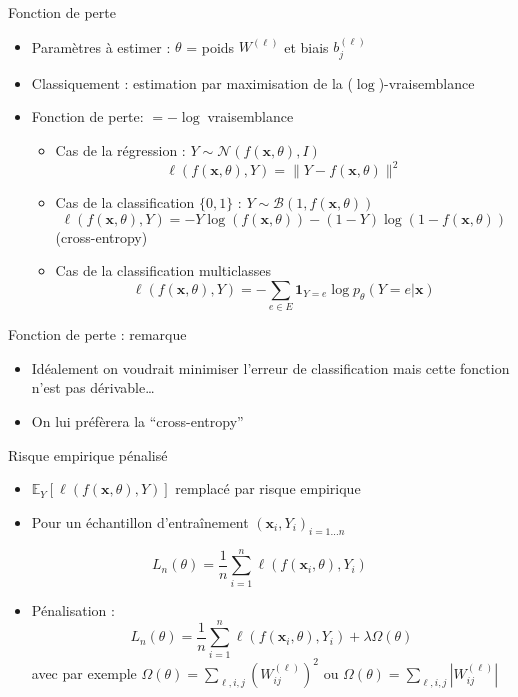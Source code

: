\documentclass[ignorenonframetext,]{beamer}
\providecommand{\tightlist}{%
  \setlength{\itemsep}{0pt}\setlength{\parskip}{0pt}}
\begin{document}
\begin{frame}{Fonction de perte}

\begin{itemize}
\tightlist
\item
  Paramètres à estimer : \(\theta\) = poids \(W^{(\ell)}\) et biais
  \(b^{(\ell)}_j\)
\item
  Classiquement : estimation par maximisation de la
  (\(\log\))-vraisemblance
\item
  Fonction de perte: \(=-\log\;\)vraisemblance

  \begin{itemize}
  \item
    Cas de la régression :
    \(Y \sim \mathcal{N}(f(\mathbf{x},\theta), I)\)
    \[ \ell(f(\mathbf{x},\theta),Y) = \| Y - f(\mathbf{x},\theta)\|^2\]
  \item
    Cas de la classification \(\{0,1\}\) :
    \(Y \sim \mathcal{B}(1,f(\mathbf{x},\theta))\)
    \[ \ell(f(\mathbf{x},\theta),Y) = -Y \log(f(\mathbf{x},\theta)) - (1-Y) \log(1- f(\mathbf{x},\theta))\]
    (cross-entropy)
  \item
    Cas de la classification multiclasses
    \[ \ell(f(\mathbf{x},\theta),Y) =-  \sum_{e \in E} \mathbf{1}_{Y=e} \log p_{\theta}(Y = e | \mathbf{x} )\]
  \end{itemize}
\end{itemize}

\end{frame}

\begin{frame}{Fonction de perte : remarque}

\begin{itemize}
\item
  Idéalement on voudrait minimiser l'erreur de classification mais cette
  fonction n'est pas dérivable\ldots{}
\item
  On lui préfèrera la ``cross-entropy''
\end{itemize}

\end{frame}

\begin{frame}{Risque empirique pénalisé}

\begin{itemize}
\item
  \(\mathbb{E}_{Y}[\ell(f(\mathbf{x},\theta),Y)]\) remplacé par risque
  empirique
\item
  Pour un échantillon d'entraînement \((\mathbf{x}_i,Y_i)_{i=1\dots n}\)
\end{itemize}

\[ L_n(\theta) = \frac{1}{n}\sum_{i=1}^n  \ell(f(\mathbf{x}_i,\theta),Y_i)\]

\begin{itemize}
\tightlist
\item
  Pénalisation :
  \[ L_n(\theta) = \frac{1}{n}\sum_{i=1}^n  \ell(f(\mathbf{x}_i,\theta),Y_i) + \lambda \Omega(\theta) \]
  avec par exemple
  \(\Omega(\theta) = \sum_{\ell,i,j} (W^{(\ell)}_{ij})^2\) ou
  \(\Omega(\theta) = \sum_{\ell,i,j} |W^{(\ell)}_{ij}|\)
\end{itemize}

\end{frame}
\end{document}
